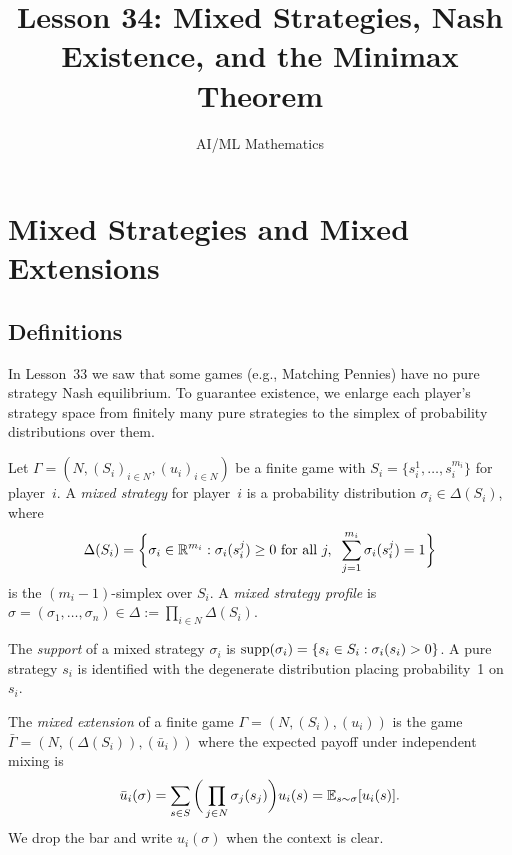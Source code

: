 \documentclass[11pt,a4paper]{article}
\title{Lesson 34: Mixed Strategies, Nash Existence, and the Minimax Theorem}
\author{AI/ML Mathematics}
\date{}
\begin{document}
\maketitle
\tableofcontents
\newpage


\section{Mixed Strategies and Mixed Extensions}
\label{sec:mixed}

\subsection{Definitions}
\label{subsec:mixed_def}

In Lesson~33 we saw that some games (e.g., Matching Pennies) have no pure
strategy Nash equilibrium. To guarantee existence, we enlarge each player's
strategy space from finitely many pure strategies to the simplex of
probability distributions over them.

\begin{definition}
\label{def:mixed_strategy}
Let $\Gamma = (N, (S_i)_{i \in N}, (u_i)_{i \in N})$ be a finite game
with $S_i = \{s_i^1, \ldots, s_i^{m_i}\}$ for player~$i$. A \emph{mixed
strategy} for player~$i$ is a probability distribution
$\sigma_i \in \Delta(S_i)$, where
\[
    \Delta(S_i) = \bigg\{\sigma_i \in \mathbb{R}^{m_i} :
    \sigma_i(s_i^j) \geq 0 \text{ for all } j, \;\;
    \sum_{j=1}^{m_i} \sigma_i(s_i^j) = 1\bigg\}
\]
is the $(m_i - 1)$-simplex over $S_i$. A \emph{mixed strategy profile} is
$\sigma = (\sigma_1, \ldots, \sigma_n) \in \Delta := \prod_{i \in N} \Delta(S_i)$.
\end{definition}

\begin{definition}[Support]
\label{def:support}
The \emph{support} of a mixed strategy $\sigma_i$ is
$\operatorname{supp}(\sigma_i) = \{s_i \in S_i : \sigma_i(s_i) > 0\}$.
A pure strategy $s_i$ is identified with the degenerate distribution
placing probability~1 on $s_i$.
\end{definition}

\begin{definition}
\label{def:mixed_extension}
The \emph{mixed extension} of a finite game $\Gamma = (N, (S_i), (u_i))$ is
the game $\bar{\Gamma} = (N, (\Delta(S_i)), (\bar{u}_i))$ where the expected
payoff under independent mixing is
\[
    \bar{u}_i(\sigma) = \sum_{s \in S} \bigg(\prod_{j \in N} \sigma_j(s_j)\bigg)
    u_i(s) = \mathbb{E}_{s \sim \sigma}[u_i(s)].
\]
We drop the bar and write $u_i(\sigma)$ when the context is clear.
\end{definition}
\end{document}
